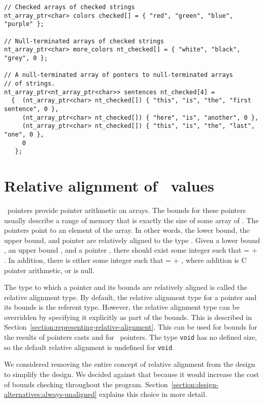 \begin{verbatim}
// Checked arrays of checked strings
nt_array_ptr<char> colors checked[] = { "red", "green", "blue", "purple" };

// Null-terminated arrays of checked strings
nt_array_ptr<char> more_colors nt_checked[] = { "white", "black", "grey", 0 };

// A null-terminated array of ponters to null-terminated arrays
// of strings.
nt_array_ptr<nt_array_ptr<char>> sentences nt_checked[4] = 
  {  (nt_array_ptr<char> nt_checked[]) { "this", "is", "the", "first sentence", 0 },
     (nt_array_ptr<char> nt_checked[]) { "here", "is", "another", 0 },
     (nt_array_ptr<char> nt_checked[]) { "this", "is", "the", "last", "one", 0 },
     0
   };
\end{verbatim}



\section{Relative alignment of \arrayptr\ values}
\label{section:relative-alignment}

\arrayptrT\ pointers provide
pointer arithmetic on arrays. The bounds for these pointers usually
describe a range of memory that is exactly the size of some array of .
The pointers point to an element of the array. In other words, the lower
bound, the upper bound, and pointer are  relatively aligned to the type
. Given a lower bound , an upper bound , and a
pointer , there should exist some integer  such that
 =  + . In addition, there is either some
integer  such that  =  + ,
where addition is C pointer arithmetic, or  is null.

The type to which a pointer and its bounds are relatively aligned is
called the relative alignment type. By default, the relative alignment
type for a pointer and its bounds is the referent type. However, the
relative alignment type can be overridden by specifying it explicitly as
part of the bounds.  This is described in 
Section~\ref{section:representing-relative-alignment}.
This can be used for bounds for the results of pointers casts and 
for  \arrayptrvoid\ pointers. The type
\texttt{void} has no defined size, so the default relative alignment is
undefined for \texttt{void}.

We considered removing the entire concept of relative alignment from the
design to simplify the design.  We decided against that because it would 
increase the cost of bounds checking throughout the program.  
Section~\ref{section:design-alternatives:always-unaligned} explains
this choice in more detail.

